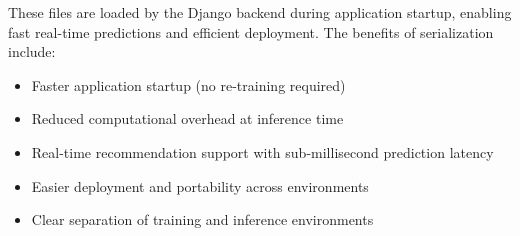 These files are loaded by the Django backend during application startup, enabling fast real-time predictions and efficient deployment. The benefits of serialization include:

\begin{itemize}
    \item Faster application startup (no re-training required)
    \item Reduced computational overhead at inference time
    \item Real-time recommendation support with sub-millisecond prediction latency
    \item Easier deployment and portability across environments
    \item Clear separation of training and inference environments
\end{itemize}
